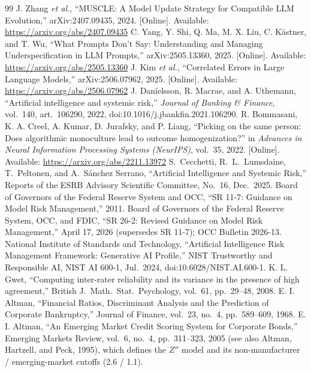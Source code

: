 \documentclass[11pt]{article}
\begin{document}
\begin{thebibliography}{99}
\small
{} J. Zhang \emph{et al.}, ``MUSCLE: A Model Update Strategy for Compatible LLM Evolution,'' arXiv:2407.09435, 2024. [Online]. Available: \url{https://arxiv.org/abs/2407.09435}
 C. Yang, Y. Shi, Q. Ma, M. X. Liu, C. K\"astner, and T. Wu, ``What Prompts Don't Say: Understanding and Managing Underspecification in LLM Prompts,'' arXiv:2505.13360, 2025. [Online]. Available: \url{https://arxiv.org/abs/2505.13360}
 J. Kim \emph{et al.}, ``Correlated Errors in Large Language Models,'' arXiv:2506.07962, 2025. [Online]. Available: \url{https://arxiv.org/abs/2506.07962}
 J. Dan\'ielsson, R. Macrae, and A. Uthemann, ``Artificial intelligence and systemic risk,'' \emph{Journal of Banking \& Finance}, vol.~140, art.~106290, 2022, doi:10.1016/j.jbankfin.2021.106290.
 R. Bommasani, K. A. Creel, A. Kumar, D. Jurafsky, and P. Liang, ``Picking on the same person: Does algorithmic monoculture lead to outcome homogenization?'' in \emph{Advances in Neural Information Processing Systems (NeurIPS)}, vol.~35, 2022. [Online]. Available: \url{https://arxiv.org/abs/2211.13972}
 S.\ Cecchetti, R.\ L.\ Lumsdaine, T.\ Peltonen, and A.\ S\'anchez Serrano, ``Artificial Intelligence and Systemic Risk,'' Reports of the ESRB Advisory Scientific Committee, No.~16, Dec.\ 2025.
 Board of Governors of the Federal Reserve System and OCC, ``SR 11-7: Guidance on Model Risk Management,'' 2011.
 Board of Governors of the Federal Reserve System, OCC, and FDIC, ``SR 26-2: Revised Guidance on Model Risk Management,'' April 17, 2026 (supersedes SR 11-7); OCC Bulletin 2026-13.
 National Institute of Standards and Technology, ``Artificial Intelligence Risk Management Framework: Generative AI Profile,'' NIST Trustworthy and Responsible AI, NIST AI 600-1, Jul.\ 2024, doi:10.6028/NIST.AI.600-1.
 K. L. Gwet, ``Computing inter-rater reliability and its variance in the presence of high agreement,'' British J.\ Math.\ Stat.\ Psychology, vol.~61, pp.~29--48, 2008.
 E. I. Altman, ``Financial Ratios, Discriminant Analysis and the Prediction of Corporate Bankruptcy,'' Journal of Finance, vol.~23, no.~4, pp.~589--609, 1968.
 E. I. Altman, ``An Emerging Market Credit Scoring System for Corporate Bonds,'' Emerging Markets Review, vol.~6, no.~4, pp.~311--323, 2005 (see also Altman, Hartzell, and Peck, 1995), which defines the $Z''$ model and its non-manufacturer / emerging-market cutoffs (2.6 / 1.1).

\end{thebibliography}
\end{document}
